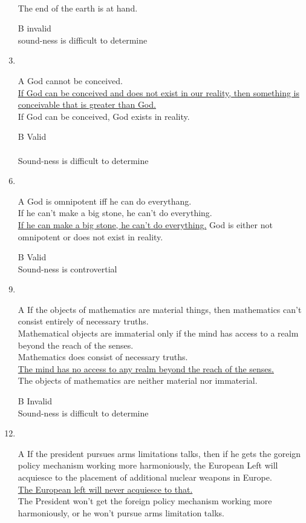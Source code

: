\documentclass{article}
\begin{document}
\begin{enumerate}
\\The end of the earth is at hand.
\item[B]
invalid
\\sound-ness is difficult to determine
\item
\item[A]
God cannot be conceived.
\\\underline{If God can be conceived and does not exist in our reality, then something is conceivable that is greater than God.}
\\If God can be conceived, God exists in reality.
\item[B]
Valid\\
\\Sound-ness is difficult to determine
\item
\item[A]
God is omnipotent iff he can do everythang.
\\If he can't make a big stone, he can't do everything.
\\\underline{If he can make a big stone, he can't do everything.}
God is either not omnipotent or does not exist in reality.
\item[B]
Valid\\
Sound-ness is controvertial
\item
\item[A]
If the objects of mathematics are material things, then mathematics can't consist entirely of necessary truths.
\\Mathematical objects are immaterial only if the mind has access to a realm beyond the reach of the senses.
\\Mathematics does consist of necessary truths.
\\\underline{The mind has no access to any realm beyond the reach of the senses.}
\\The objects of mathematics are neither material nor immaterial.	
\item[B]
Invalid\\
Sound-ness is difficult to determine
\item
\item[A]
If the president pursues arms limitations talks, then if he gets the goreign policy mechanism working more harmoniously, the European Left will acquiesce to the placement of additional nuclear weapons in Europe.
\\\underline{The European left will never acquiesce to that.}
\\The President won't get the foreign policy mechanism working more harmoniously, or he won't pursue arms limitation talks.

\end{enumerate}
\end{document}
